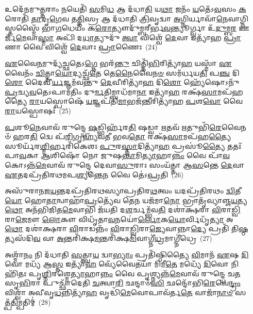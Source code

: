 𑌉𑌦𑍇᳴𑌨𑌮𑍁\-\ul{𑌤𑍍𑌤}\-𑌰𑌾𑌂 \ul{𑌨}\-𑌯𑍇𑌤𑌿᳴ \ul{𑌸}\-𑌮𑌿\-\ul{𑌧} 𑌆 𑌦᳴𑌧𑌾\-\ul{𑌤𑌿} 𑌯\-\ul{𑌥𑌾} 𑌜𑌨𑌂᳴ \ul{𑌯}\-𑌤𑍇᳴\-𑌽\-\ul{𑌵}\-𑌸𑌂 \ul{𑌕}\-𑌰𑍋𑌤𑌿᳴ \ul{𑌤𑌾}\-𑌦𑍃\-\ul{𑌗𑍇}\-𑌵 𑌤\-\ul{𑌤𑍍𑌤𑌿}\-𑌸𑍍𑌰 𑌆 𑌦᳴𑌧𑌾𑌤𑌿 \ul{𑌤𑍍𑌰𑌿}\-𑌵𑍃𑌦𑍍𑌵𑌾 \ul{𑌅}\-𑌗𑍍𑌨𑌿𑌰𑍍𑌯𑌾𑌵𑌾᳴\-\ul{𑌨𑍇}\-𑌵𑌾𑌗𑍍𑌨𑌿𑌸𑍍𑌤𑌸𑍍𑌮𑍈᳴ 𑌭𑌾\-\ul{𑌗}\-𑌧𑍇𑌯𑌂᳴ 𑌕\-\ul{𑌰𑍋}\-𑌤𑍍𑌯𑍗𑌦𑍁᳴𑌮𑍍𑌬𑌰𑍀𑌰𑍍𑌭\-\ul{𑌵}\-𑌨𑍍𑌤𑍍𑌯𑍂𑌰𑍍𑌗𑍍𑌵𑌾 𑌉᳴\-\ul{𑌦𑍁}\-𑌮𑍍𑌬\-\ul{𑌰} 𑌊𑌰𑍍𑌜᳴\-\ul{𑌮𑍇}\-𑌵𑌾\-\ul{𑌸𑍍𑌮𑌾} 𑌅𑌪𑌿᳴ 𑌦\-\ul{𑌧𑌾}\-𑌤𑍍𑌯𑍁𑌦𑍁᳴ \ul{𑌤𑍍𑌵𑌾} 𑌵𑌿𑌶𑍍𑌵𑍇᳴ \ul{𑌦𑍇}\-𑌵𑌾 𑌇𑌤𑍍𑌯𑌾᳴𑌹 \ul{𑌪𑍍𑌰𑌾}\-𑌣𑌾 𑌵𑍈 𑌵𑌿𑌶𑍍𑌵𑍇᳴ \ul{𑌦𑍇}\-𑌵𑌾𑌃 \ul{𑌪𑍍𑌰𑌾}\-𑌣𑍈𑌃~(24)

\-\ul{𑌏}\-𑌵𑍈\-\ul{𑌨}\-𑌮𑍁𑌦𑍍𑌯᳴\-\ul{𑌚𑍍𑌛}\-𑌤𑍇\-𑌽\-\ul{𑌗𑍍𑌨𑍇} 𑌭𑌰᳴\-\ul{𑌨𑍍𑌤𑍁} 𑌚𑌿𑌤𑍍𑌤𑌿᳴\-\ul{𑌭𑌿}\-𑌰𑌿𑌤𑍍𑌯𑌾᳴\-\ul{𑌹} 𑌯𑌸𑍍𑌮𑌾᳴ \ul{𑌏}\-𑌵𑍈𑌨𑌂᳴ \ul{𑌚𑌿}\-𑌤𑍍𑌤𑌾\-\ul{𑌯𑍋}\-𑌦𑍍𑌯𑌚𑍍𑌛᳴\-\ul{𑌤𑍇} 𑌤𑍇\-\ul{𑌨𑍈}\-𑌵𑍈\-\ul{𑌨}\-\-\ul{𑍞} 𑌸𑌮᳴𑌰𑍍𑌧𑌯\-\ul{𑌤𑌿} 𑌪\-\ul{𑌞𑍍𑌚} 𑌦𑌿\-\ul{𑌶𑍋} 𑌦𑍈𑌵𑍀॑\-\ul{𑌰𑍍𑌯}\-𑌜𑍍𑌞𑌮᳴𑌵𑌨𑍍𑌤𑍁 \ul{𑌦𑍇}\-𑌵𑍀𑌰𑌿𑌤𑍍𑌯𑌾᳴\-\ul{𑌹} 𑌦𑌿\-\ul{𑌶𑍋} 𑌹𑍍𑌯𑍇᳴𑌷𑍋\-𑌽𑌨𑍁᳴ \ul{𑌪𑍍𑌰}\-𑌚𑍍𑌯\-\ul{𑌵}\-𑌤𑍇\-𑌽𑌪𑌾𑌮᳴𑌤𑌿𑌂 𑌦𑍁\-\ul{𑌰𑍍𑌮}\-𑌤𑌿𑌮𑍍𑌬𑌾𑌧᳴𑌮𑌾\-\ul{𑌨𑌾} 𑌇𑌤𑍍𑌯𑌾᳴\-\ul{𑌹} 𑌰𑌕𑍍𑌷᳴\-\ul{𑌸𑌾}\-𑌮𑌪᳴𑌹𑌤𑍍𑌯𑍈 \ul{𑌰𑌾}\-𑌯𑌸𑍍𑌪𑍋𑌷𑍇᳴ \ul{𑌯}\-𑌜𑍍𑌞𑌪᳴𑌤𑌿\-\ul{𑌮𑌾}\-𑌭𑌜᳴\-\ul{𑌨𑍍𑌤𑍀}\-𑌰𑌿𑌤𑍍𑌯𑌾᳴𑌹 \ul{𑌪}\-𑌶\-\ul{𑌵𑍋} 𑌵𑍈 \ul{𑌰𑌾}\-𑌯𑌸𑍍𑌪𑍋𑌷𑌃᳴~(25)

\-\ul{𑌪}\-𑌶𑍂\-\ul{𑌨𑍇}\-𑌵𑌾𑌵᳴ 𑌰𑍁𑌨𑍍𑌦𑍍𑌧𑍇 \ul{𑌷}\-𑌡𑍍𑌭𑌿𑌰𑍍\mbox{}𑌹᳴𑌰\-\ul{𑌤𑌿} 𑌷𑌡𑍍𑌵𑌾 \ul{𑌋}\-𑌤𑌵᳴ \ul{𑌋}\-𑌤𑍁𑌭𑌿᳴\-\ul{𑌰𑍇}\-𑌵𑍈𑌨𑍞᳴ 𑌹𑌰\-\ul{𑌤𑌿} 𑌦𑍍𑌵𑍇 𑌪᳴\-\ul{𑌰𑌿}\-𑌗𑍃𑌹𑍍𑌯᳴𑌵𑌤𑍀 𑌭𑌵\-\ul{𑌤𑍋} 𑌰𑌕𑍍𑌷᳴\-\ul{𑌸𑌾}\-𑌮𑌪᳴𑌹\-\ul{𑌤𑍍𑌯𑍈} 𑌸𑍂𑌰𑍍𑌯᳴𑌰\-\ul{𑌶𑍍𑌮𑌿}\-𑌰𑍍\mbox{}𑌹𑌰𑌿᳴𑌕𑍇𑌶𑌃 \ul{𑌪𑍁}\-𑌰\-\ul{𑌸𑍍𑌤𑌾}\-𑌦𑌿𑌤𑍍𑌯𑌾᳴\-\ul{𑌹} 𑌪𑍍𑌰𑌸𑍂॑\-\ul{𑌤𑍍𑌯𑍈} 𑌤𑌤𑌃᳴ 𑌪𑌾\-\ul{𑌵}\-𑌕𑌾 \ul{𑌆}\-𑌶𑌿𑌷𑍋᳴ 𑌨𑍋 𑌜𑍁𑌷\-\ul{𑌨𑍍𑌤𑌾}\-𑌮𑌿\-\ul{𑌤𑍍𑌯𑌾}\-𑌹𑌾\-\ul{𑌨𑍍𑌨𑌂} 𑌵𑍈 𑌪𑌾᳴\-\ul{𑌵}\-𑌕𑍋\-𑌽𑌨𑍍𑌨᳴\-\ul{𑌮𑍇}\-𑌵𑌾𑌵᳴ 𑌰𑍁𑌨𑍍𑌦𑍍𑌧𑍇 𑌦𑍇𑌵𑌾\-\ul{𑌸𑍁}\-𑌰𑌾𑌃 𑌸𑌂𑌯᳴𑌤𑍍𑌤𑌾 𑌆\-\ul{𑌸}\-𑌨𑍍𑌤𑍇 \ul{𑌦𑍇}\-𑌵𑌾 \ul{𑌏}\-𑌤𑌦𑌪𑍍𑌰᳴𑌤𑌿𑌰𑌥𑌮𑌪\-\ul{𑌶𑍍𑌯}\-𑌨𑍍𑌤𑍇\-\ul{𑌨} 𑌵𑍈 𑌤𑍇॑\-𑌽\-\ul{𑌪𑍍𑌰}\-𑌤𑌿~(26)

𑌅𑌸𑍁᳴𑌰𑌾𑌨𑌜\-\ul{𑌯}\-𑌨𑍍𑌤𑌦𑌪𑍍𑌰᳴𑌤𑌿𑌰𑌥𑌸𑍍𑌯𑌾𑌪𑍍𑌰𑌤𑌿𑌰\-\ul{𑌥}\-𑌤𑍍𑌵𑌂 𑌯𑌦𑌪𑍍𑌰᳴𑌤𑌿𑌰𑌥𑌂 \ul{𑌦𑍍𑌵𑌿}\-𑌤𑍀\-\ul{𑌯𑍋} 𑌹𑍋\-\ul{𑌤𑌾}\-𑌨𑍍𑌵𑌾𑌹𑌾॑\-\ul{𑌪𑍍𑌰}\-𑌤𑍍𑌯𑍇᳴𑌵 𑌤𑍇\-\ul{𑌨} 𑌯𑌜᳴𑌮𑌾\-\ul{𑌨𑍋} 𑌭𑍍𑌰𑌾𑌤𑍃᳴𑌵𑍍𑌯𑌾𑌞𑍍𑌜\-\ul{𑌯}\-𑌤𑍍𑌯\-\ul{𑌥𑍋} 𑌅𑌨᳴𑌭𑌿𑌜𑌿𑌤\-\ul{𑌮𑍇}\-𑌵𑌾𑌭𑌿 𑌜᳴𑌯𑌤𑌿 𑌦\-\ul{𑌶}\-𑌰𑍍𑌚𑌮𑍍𑌭᳴𑌵\-\ul{𑌤𑌿} 𑌦𑌶𑌾॑𑌕𑍍𑌷𑌰𑌾 \ul{𑌵𑌿}\-𑌰𑌾\-\ul{𑌡𑍍𑌵𑌿}\-𑌰𑌾\-\ul{𑌜𑍇}\-𑌮𑍗 \ul{𑌲𑍋}\-𑌕𑍗 𑌵𑌿𑌧𑍃᳴𑌤𑌾\-\ul{𑌵}\-𑌨𑌯𑍋॑\-\ul{𑌰𑍍𑌲𑍋}\-𑌕\-\ul{𑌯𑍋}\-𑌰𑍍𑌵𑌿𑌧𑍃᳴\-\ul{𑌤𑍍𑌯𑌾} 𑌅\-\ul{𑌥𑍋} 𑌦𑌶𑌾॑𑌕𑍍𑌷𑌰𑌾 \ul{𑌵𑌿}\-𑌰𑌾𑌡𑌨𑍍𑌨𑌂᳴ \ul{𑌵𑌿}\-𑌰𑌾\-\ul{𑌡𑍍𑌵𑌿}\-𑌰𑌾\-\ul{𑌜𑍍𑌯𑍇}\-𑌵𑌾𑌨𑍍𑌨𑌾\-\ul{𑌦𑍍𑌯𑍇} 𑌪𑍍𑌰𑌤𑌿᳴ 𑌤𑌿\-\ul{𑌷𑍍𑌠}\-𑌤𑍍𑌯𑌸᳴𑌦𑌿\-\ul{𑌵} 𑌵𑌾 \ul{𑌅}\-𑌨𑍍𑌤𑌰𑌿᳴𑌕𑍍𑌷\-\ul{𑌮}\-𑌨𑍍𑌤𑌰𑌿᳴𑌕𑍍𑌷\-\ul{𑌮𑌿}\-𑌵𑌾𑌗𑍍𑌨𑍀॑\-\ul{𑌧𑍍𑌰}\-𑌮𑌾𑌗𑍍𑌨𑍀॑𑌧𑍍𑌰𑍇~(27)

𑌅𑌶𑍍𑌮𑌾᳴\-\ul{𑌨𑌂} 𑌨𑌿 𑌦᳴𑌧𑌾𑌤𑌿 \ul{𑌸}\-𑌤𑍍𑌤𑍍𑌵𑌾\-\ul{𑌯} 𑌦𑍍𑌵𑌾\-\ul{𑌭𑍍𑌯𑌾𑌂} 𑌪𑍍𑌰𑌤𑌿᳴𑌷𑍍𑌠𑌿𑌤𑍍𑌯𑍈 \ul{𑌵𑌿}\-𑌮𑌾𑌨᳴ \ul{𑌏}\-𑌷 \ul{𑌦𑌿}\-𑌵𑍋 𑌮𑌧𑍍𑌯᳴ 𑌆\-\ul{𑌸𑍍𑌤} 𑌇𑌤𑍍𑌯𑌾᳴\-\ul{𑌹} 𑌵𑍍𑌯𑍇᳴𑌵𑍈𑌤𑌯𑌾᳴ 𑌮𑌿𑌮𑍀\-\ul{𑌤𑍇} 𑌮𑌧𑍍𑌯𑍇᳴ \ul{𑌦𑌿}\-𑌵𑍋 𑌨𑌿𑌹𑌿᳴𑌤𑌃 𑌪𑍃\-\ul{𑌶𑍍𑌨𑌿}\-𑌰𑌶𑍍𑌮𑍇\-\ul{𑌤𑍍𑌯𑌾}\-𑌹𑌾\-\ul{𑌨𑍍𑌨𑌂} 𑌵𑍈 𑌪𑍃𑌶𑍍𑌨𑍍𑌯𑌨𑍍𑌨᳴\-\ul{𑌮𑍇}\-𑌵𑌾𑌵᳴ 𑌰𑍁𑌨𑍍𑌦𑍍𑌧𑍇 𑌚\-\ul{𑌤}\-𑌸𑍃\-\ul{𑌭𑌿}\-𑌰𑌾 𑌪𑍁𑌚𑍍𑌛𑌾᳴𑌦𑍇𑌤𑌿 \ul{𑌚}\-𑌤𑍍𑌵𑌾\-\ul{𑌰𑌿} 𑌛𑌨𑍍𑌦𑌾𑍞᳴\-\ul{𑌸𑌿} 𑌛𑌨𑍍𑌦𑍋᳴𑌭𑌿\-\ul{𑌰𑍇}\-𑌵𑍇\-\ul{𑌨𑍍𑌦𑍍𑌰𑌂} 𑌵𑌿𑌶𑍍𑌵𑌾᳴ 𑌅𑌵𑍀𑌵𑍃\-\ul{𑌧}\-𑌨𑍍𑌨𑌿𑌤𑍍𑌯𑌾᳴\-\ul{𑌹} 𑌵𑍃𑌦𑍍𑌧𑌿᳴\-\ul{𑌮𑍇}\-𑌵𑍋𑌪𑌾𑌵᳴𑌰𑍍𑌤\-\ul{𑌤𑍇} 𑌵𑌾𑌜𑌾᳴\-\ul{𑌨𑌾}\-\-\ul{𑍞} 𑌸𑌤𑍍𑌪᳴\-\ul{𑌤𑌿}\-𑌮𑍍𑌪𑌤𑌿𑌮𑍍॑~(28)


